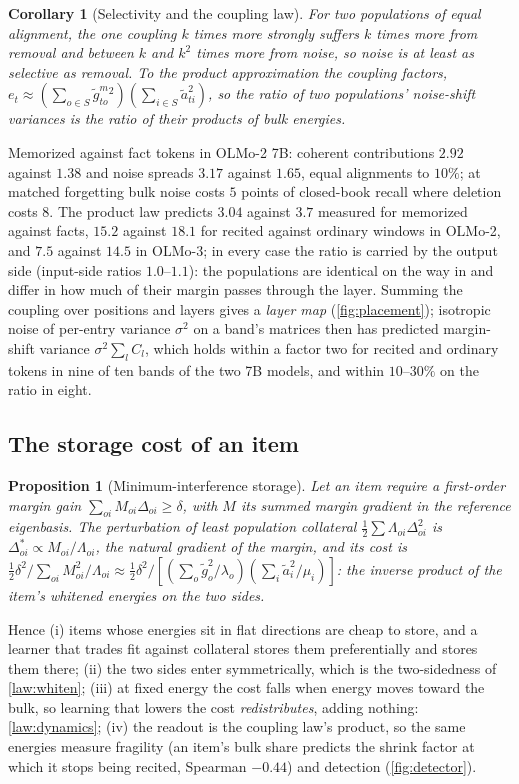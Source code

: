 \documentclass{article}
\newtheorem{proposition}{Proposition}
\newtheorem{corollary}{Corollary}
\theoremstyle{definition}\newtheorem{law}{Empirical law}
\begin{document}
\begin{corollary}[Selectivity and the coupling law]\label{cor:selectivity}
For two populations of equal alignment, the one coupling $k$ times more strongly suffers $k$ times more from removal and between $k$ and $k^2$ times more from noise, so noise is at least as selective as removal. To the product approximation the coupling factors, $e_t\approx(\sum_{o\in S}\tilde g^{m}_{to}{}^2)(\sum_{i\in S}\tilde a_{ti}^2)$, so the ratio of two populations' noise-shift variances is the ratio of their products of bulk energies.
\end{corollary}
\label{cor:coupling}
Memorized against fact tokens in OLMo-2 7B: coherent contributions $2.92$ against $1.38$ and noise spreads $3.17$ against $1.65$, equal alignments to $10\%$; at matched forgetting bulk noise costs $5$ points of closed-book recall where deletion costs $8$. The product law predicts $3.04$ against $3.7$ measured for memorized against facts, $15.2$ against $18.1$ for recited against ordinary windows in OLMo-2, and $7.5$ against $14.5$ in OLMo-3; in every case the ratio is carried by the output side (input-side ratios $1.0$--$1.1$): the populations are identical on the way in and differ in how much of their margin passes through the layer. Summing the coupling over positions and layers gives a \emph{layer map} (\cref{fig:placement}); isotropic noise of per-entry variance $\sigma^2$ on a band's matrices then has predicted margin-shift variance $\sigma^2\sum_lC_l$, which holds within a factor two for recited and ordinary tokens in nine of ten bands of the two 7B models, and within $10$--$30\%$ on the ratio in eight.

\subsection{The storage cost of an item}\label{sec:storage}

\begin{proposition}[Minimum-interference storage]\label{prop:storage}
Let an item require a first-order margin gain $\sum_{oi}M_{oi}\Delta_{oi}\ge\delta$, with $M$ its summed margin gradient in the reference eigenbasis. The perturbation of least population collateral $\tfrac12\sum\Lambda_{oi}\Delta_{oi}^2$ is $\Delta^*_{oi}\propto M_{oi}/\Lambda_{oi}$, the natural gradient of the margin, and its cost is $\tfrac12\delta^2/\sum_{oi}M^2_{oi}/\Lambda_{oi}\approx\tfrac12\delta^2/[(\sum_o\tilde g_o^2/\lambda_o)(\sum_i\tilde a_i^2/\mu_i)]$: the inverse product of the item's \emph{whitened} energies on the two sides.
\end{proposition}
Hence (i) items whose energies sit in flat directions are cheap to store, and a learner that trades fit against collateral stores them preferentially and stores them there; (ii) the two sides enter symmetrically, which is the two-sidedness of \cref{law:whiten}; (iii) at fixed energy the cost falls when energy moves toward the bulk, so learning that lowers the cost \emph{redistributes}, adding nothing: \cref{law:dynamics}; (iv) the readout is the coupling law's product, so the same energies measure fragility (an item's bulk share predicts the shrink factor at which it stops being recited, Spearman $-0.44$) and detection (\cref{fig:detector}).
\end{document}
